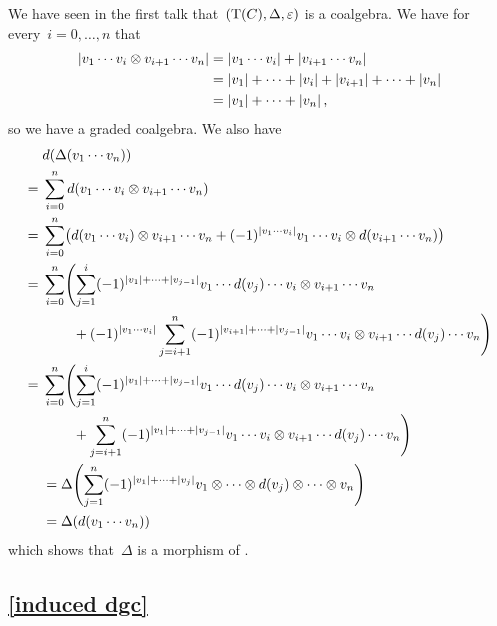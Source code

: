 We have seen in the first talk that~$(\operatorname{T}(C), \Delta, \varepsilon)$ is a coalgebra.
We have for every~$i = 0, \dotsc, n$ that
\begin{align*}
  \lvert v_1 \dotsm v_i \otimes v_{i+1} \dotsm v_n\rvert
  &=
  \lvert v_1 \dotsm v_i\rvert + \lvert v_{i+1} \dotsm v_n\rvert
  \\
  &=
  \lvert v_1\rvert + \dotsb + \lvert v_i\rvert + \lvert v_{i+1}\rvert + \dotsb + \lvert v_n\rvert
  \\
  &=
  \lvert v_1\rvert + \dotsb + \lvert v_n\rvert  \,,
\end{align*}
so we have a graded coalgebra.
We also have
\begingroup
\allowdisplaybreaks
\begin{align*}
  {}&
  d(\Delta(v_1 \dotsm v_n))
  \\
  ={}&
  \sum_{i=0}^n d(v_1 \dotsm v_i \tensor v_{i+1} \dotsm v_n)
  \\
  ={}&
  \sum_{i=0}^n
  \bigl(
      d(v_1 \dotsm v_i) \tensor v_{i+1} \dotsm v_n
    + (-1)^{\hdeg{v_1 \dotsm v_i}}
      v_1 \dotsm v_i \tensor d(v_{i+1} \dotsm v_n)
  \bigr)
  \\
  ={}&
  \sum_{i=0}^n
  \Biggl(
    \sum_{j=1}^i
    (-1)^{\hdeg{v_1} + \dotsb + \hdeg{v_{j-1}}}
    v_1 \dotsm d(v_j) \dotsm v_i \tensor v_{i+1} \dotsm v_n
  \\
  {}&
  \phantom{\sum_{i=0}^n \biggl(}
  + (-1)^{\hdeg{v_1 \dotsm v_i}}
  \sum_{j=i+1}^n
  (-1)^{\hdeg{v_{i+1}} + \dotsb + \hdeg{v_{j-1}}}
  v_1 \dotsm v_i \tensor v_{i+1} \dotsm d(v_j) \dotsm v_n
  \Biggl)
  \\
  ={}&
  \sum_{i=0}^n
  \Biggl(
    \sum_{j=1}^i
    (-1)^{\hdeg{v_1} + \dotsb + \hdeg{v_{j-1}}}
    v_1 \dotsm d(v_j) \dotsm v_i \tensor v_{i+1} \dotsm v_n
  \\
  {}&
  \phantom{\sum_{i=0}^n \biggl(}
  + \sum_{j=i+1}^n
  (-1)^{\hdeg{v_1} + \dotsb + \hdeg{v_{j-1}}}
  v_1 \dotsm v_i \tensor v_{i+1} \dotsm d(v_j) \dotsm v_n
  \Biggl)
  \\
  &=
  \Delta
  \Biggl(
    \sum_{j=1}^n
    (-1)^{\hdeg{v_1} + \dotsb + \hdeg{v_j}}
    v_1 \tensor \dotsm \tensor d(v_j) \tensor \dotsb \tensor v_n
  \Biggr)
  \\
  &=
  \Delta(d(v_1 \dotsm v_n))
  \end{align*}
  \endgroup
which shows that~$\Delta$ is a morphism of {\dgvs}.





\subsection{\cref{induced dgc}}
\label{induced dgc proof}


